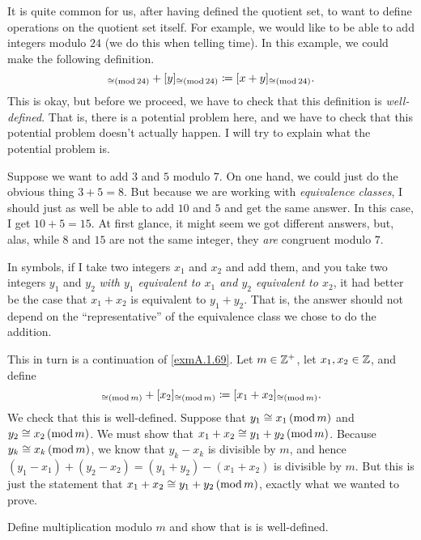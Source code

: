 It is quite common for us, after having defined the quotient set, to want to define operations on the quotient set itself.  For example, we would like to be able to add integers modulo $24$ (we do this when telling time).  In this example, we could make the following definition.
\begin{equation}
[x]_{\cong \mmod{24}}+[y]_{\cong \mmod{24}}\coloneqq [x+y]_{\cong \mmod{24}}.
\end{equation}
This is okay, but before we proceed, we have to check that this definition is \emph{well-defined}.  That is, there is a potential problem here, and we have to check that this potential problem doesn't actually happen.  I will try to explain what the potential problem is.

Suppose we want to add $3$ and $5$ modulo $7$.  On one hand, we could just do the obvious thing $3+5=8$.  But because we are working with \emph{equivalence classes}, I should just as well be able to add $10$ and $5$ and get the same answer.  In this case, I get $10+5=15$.  At first glance, it might seem we got different answers, but, alas, while $8$ and $15$ are not the same integer, they \emph{are} congruent modulo $7$.

In symbols, if I take two integers $x_1$ and $x_2$ and add them, and you take two integers $y_1$ and $y_2$ \emph{with $y_1$ equivalent to $x_1$ and $y_2$ equivalent to $x_2$}, it had better be the case that $x_1+x_2$ is equivalent to $y_1+y_2$.  That is, the answer should not depend on the ``representative'' of the equivalence class we chose to do the addition.
\begin{exm}
This in turn is a continuation of \cref{exmA.1.69}.  Let $m\in \mathbb{Z} ^+$, let $x_1,x_2\in \mathbb{Z}$, and define
\begin{equation}
[x_1]_{\cong \mmod{m}}+[x_2]_{\cong \mmod{m}}\coloneqq [x_1+x_2]_{\cong \mmod{m}}.
\end{equation}
We check that this is well-defined.  Suppose that $y_1\cong x_1\left( \mathrm{mod}\, m\right)$ and $y_2\cong x_2\left( \mathrm{mod}\, m\right)$.  We must show that $x_1+x_2\cong y_1+y_2\left( \mathrm{mod}\, m\right)$.  Because $y_k\cong x_k\left( \mathrm{mod}\, m\right)$, we know that $y_k-x_k$ is divisible by $m$, and hence $(y_1-x_1)+(y_2-x_2)=(y_1+y_2)-(x_1+x_2)$ is divisible by $m$.  But this is just the statement that $x_1+x_2\cong y_1+y_2\left( \mathrm{mod}\, m\right)$, exactly what we wanted to prove.
\begin{exr}
Define multiplication modulo $m$ and show that is is well-defined.
\end{exr}
\end{exm}

